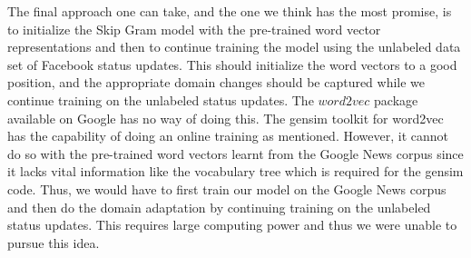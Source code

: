 The final approach one can take, and the one we think has the most promise, is to initialize the Skip Gram model with the pre-trained word vector representations and then to continue training the model using the unlabeled data set of Facebook status updates. This should initialize the word vectors to a good position, and the appropriate domain changes should be captured while we continue training on the unlabeled status updates. The $word2vec$ package available on Google has no way of doing this. The gensim toolkit for word2vec has the capability of doing an online training as mentioned. However, it cannot do so with the pre-trained word vectors learnt from the Google News corpus since it lacks vital information like the vocabulary tree which is required for the gensim code. Thus, we would have to first train our model on the Google News corpus and then do the domain adaptation by continuing training on the unlabeled status updates. This requires large computing power and thus we were unable to pursue this idea.

